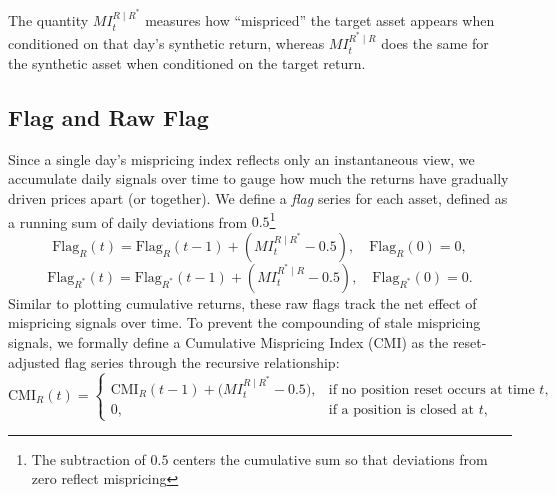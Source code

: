 The quantity $MI_t^{R \mid R^*}$ measures how ``mispriced'' the target asset appears when conditioned on that day's synthetic return, whereas $MI_t^{R^* \mid R}$ does the same for the synthetic asset when conditioned on the target return.

\subsection{Flag and Raw Flag}

Since a single day's mispricing index reflects only an instantaneous view, we accumulate daily signals over time to gauge how much the returns have gradually driven prices apart (or together). We define a \emph{flag} series for each asset, defined as a running sum of daily deviations from $0.5$\footnote{The subtraction of $0.5$ centers the cumulative sum so that deviations from zero reflect mispricing}
\begin{equation}
\label{eq:FlagRstar}
\text{Flag}_{R}(t) = \text{Flag}_{R}(t-1) + (MI_t^{R \mid R^*} - 0.5),
\quad \text{Flag}_{R}(0) = 0,
\end{equation}
\begin{equation}
\label{eq:FlagR}
\text{Flag}_{R^*}(t) = \text{Flag}_{R^*}(t-1) + (MI_t^{R^* \mid R} - 0.5),
\quad \text{Flag}_{R^*}(0) = 0.
\end{equation}
Similar to plotting cumulative returns, these raw flags track the net effect of mispricing signals over time. 
%
To prevent the compounding of stale mispricing signals, we formally define a Cumulative Mispricing Index (CMI) as the reset-adjusted flag series through the recursive relationship:
$$
\mathrm{CMI}_R(t) =
\begin{cases}
\mathrm{CMI}_R(t-1) + \bigl(MI_t^{R\mid R^*} - 0.5\bigr), & \text{if no position reset occurs at time } t,\\
0, & \text{if a position is closed at } t,
\end{cases}
$$
